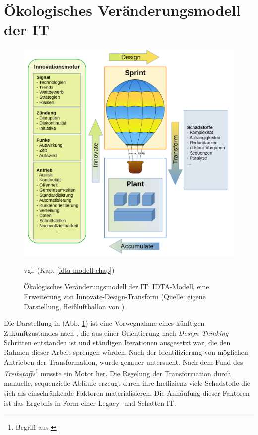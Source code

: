 \section{Ökologisches Veränderungsmodell der IT}
\begin{figure}[htbp]
 \centering
 \includegraphics[width=1.0\textwidth]{gfx/digital-transformation-lifecycle-by-selim4.PNG}
 \caption{Ökologisches Veränderungsmodell der IT: IDTA-Modell, eine Erweiterung von Innovate-Design-Transform \cite{Koch2016} (Quelle: eigene Darstellung, Heißluftballon von \citet{maidis_2006})\label{fig:digit-trans-idt}
 } vgl. (Kap. \ref{idta-modell-chap})
 \end{figure}

Die Darstellung in (Abb. \ref{fig:digit-trans-idt}) ist eine Vorwegnahme eines künftigen Zukunftzustandes nach \cite{Alt2017}, die aus einer Orientierung nach \emph{Design-Thinking} Schritten entstanden ist und ständigen Iterationen ausgesetzt war, die den Rahmen dieser Arbeit sprengen würden. Nach der Identifizierung von möglichen Antrieben der Transformation, wurde \cite{Ganswindt2006} genauer untersucht. Nach dem Fund des \emph{Treibstoffs}\footnote{Begriff aus \cite{Ganswindt2006}}  musste ein Motor her. Die Regelung der Transformation durch manuelle, sequenzielle Abläufe erzeugt durch ihre Ineffizienz viele Schadstoffe die sich als einschränkende Faktoren materialisieren. Die Anhäufung dieser Faktoren ist das Ergebnis in Form einer Legacy- und Schatten-IT.

